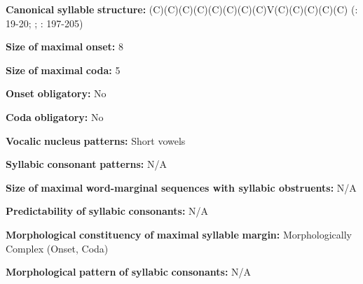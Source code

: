 \begin{styleBody}
\textbf{Canonical} \textbf{syllable} \textbf{structure:} (C)(C)(C)(C)(C)(C)(C)(C)V(C)(C)(C)(C)(C) (\citealt{Hewitt1995}: 19-20; \citealt{Vogt1958}; \citealt{Butskhrikidze2002}: 197-205)
\end{styleBody}

\begin{styleBody}
\textbf{Size} \textbf{of} \textbf{maximal} \textbf{onset:} 8
\end{styleBody}

\begin{styleBody}
\textbf{Size} \textbf{of} \textbf{maximal} \textbf{coda:} 5
\end{styleBody}

\begin{styleBody}
\textbf{Onset} \textbf{obligatory:} No
\end{styleBody}

\begin{styleBody}
\textbf{Coda} \textbf{obligatory:} No
\end{styleBody}

\begin{styleBody}
\textbf{Vocalic} \textbf{nucleus} \textbf{patterns:} Short vowels
\end{styleBody}

\begin{styleBody}
\textbf{Syllabic} \textbf{consonant} \textbf{patterns:} N/A
\end{styleBody}

\begin{styleBody}
\textbf{Size} \textbf{of} \textbf{maximal} \textbf{word{}-marginal sequences with syllabic obstruents:} N/A
\end{styleBody}

\begin{styleBody}
\textbf{Predictability} \textbf{of} \textbf{syllabic} \textbf{consonants:} N/A
\end{styleBody}

\begin{styleBody}
\textbf{Morphological} \textbf{constituency} \textbf{of} \textbf{maximal} \textbf{syllable} \textbf{margin:} Morphologically Complex (Onset, Coda)
\end{styleBody}

\begin{styleBody}
\textbf{Morphological} \textbf{pattern} \textbf{of} \textbf{syllabic} \textbf{consonants:} N/A
\end{styleBody}

